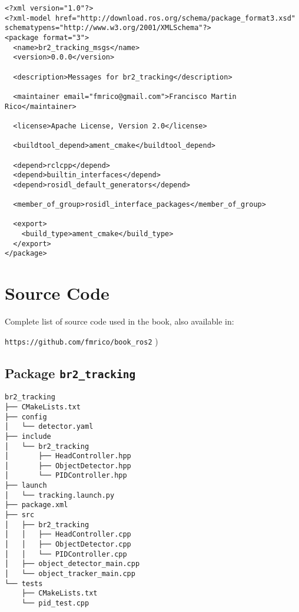  \footnotesize
\begin{tcolorbox}[sharp corners, colframe=gray!80, colback=LightGray, left=0pt, top=0pt, bottom=0pt, title=\texttt{br2\_tracking\_msgs/package.xml}]
  \begin{verbatim}
<?xml version="1.0"?>
<?xml-model href="http://download.ros.org/schema/package_format3.xsd" schematypens="http://www.w3.org/2001/XMLSchema"?>
<package format="3">
  <name>br2_tracking_msgs</name>
  <version>0.0.0</version>
  
  <description>Messages for br2_tracking</description>

  <maintainer email="fmrico@gmail.com">Francisco Martin Rico</maintainer>
 
  <license>Apache License, Version 2.0</license>

  <buildtool_depend>ament_cmake</buildtool_depend>

  <depend>rclcpp</depend>
  <depend>builtin_interfaces</depend>
  <depend>rosidl_default_generators</depend>

  <member_of_group>rosidl_interface_packages</member_of_group>

  <export>
    <build_type>ament_cmake</build_type>
  </export>
</package>
    \end{verbatim}
    \end{tcolorbox}
  \normalsize



\appendix

\chapter[Source Code]{Source Code}
\label{cap:source}
Complete list of source code used in the book, also available in:

\vspace{0.5cm}
\large
\texttt{https://github.com/fmrico/book\_ros2}
\normalsize
)
\section{Package \texttt{br2\_tracking}}
\label{sec:anex:br2_tracking}

 \footnotesize
\begin{tcolorbox}[sharp corners, colframe=gray!80, colback=LightGray, left=0pt, top=0pt, bottom=0pt, title=Package \texttt{br2\_tracking}]
  \begin{verbatim}
br2_tracking
├── CMakeLists.txt
├── config
│   └── detector.yaml
├── include
│   └── br2_tracking
│       ├── HeadController.hpp
│       ├── ObjectDetector.hpp
│       └── PIDController.hpp
├── launch
│   └── tracking.launch.py
├── package.xml
├── src
│   ├── br2_tracking
│   │   ├── HeadController.cpp
│   │   ├── ObjectDetector.cpp
│   │   └── PIDController.cpp
│   ├── object_detector_main.cpp
│   └── object_tracker_main.cpp
└── tests
    ├── CMakeLists.txt
    └── pid_test.cpp    \end{verbatim}
    \end{tcolorbox}
  \normalsize

